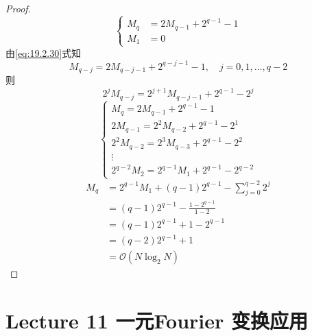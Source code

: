 \documentclass[linespread=1.5,openany]{book}%
\theoremstyle{plain}
\begin{document}
{{{\begin{proof}
						\begin{equation}\label{eq:19.2.30}
							\left\{
							\begin{aligned}
								M_q &= 2 M_{q-1} + 2^{q-1} -1 \\[8pt]
								M_1 &= 0
							\end{aligned}
							\right.
						\end{equation}
						由\eqref{eq:19.2.30}式知 
						\begin{equation}
							M_{q-j} = 2 M_{q-j-1} + 2^{q -j -1} -1, \quad j=0,1,\ldots,q-2
						\end{equation}
						则
						\begin{equation} 
							2^j M_{q-j} = 2^{j+1} M_{q-j-1} + 2^{q-1} - 2^j
						\end{equation}
						\[
						\begin{cases}
							M_{q} = 2M_{q - 1} + 2^{q - 1} - 1 \\
							2M_{q - 1} = 2^{2}M_{q - 2} + 2^{q - 1} - 2^{1} \\
							2^{2}M_{q - 2} = 2^{3}M_{q - 3} + 2^{q - 1} - 2^{2} \\
							\vdots \\
							2^{q - 2}M_{2} = 2^{q - 1}M_{1} + 2^{q - 1} - 2^{q - 2}
						\end{cases}
						\]
						\[
						\begin{aligned}
							M_{q}&=2^{q - 1}M_{1}+(q - 1)2^{q - 1}-\sum_{j = 0}^{q - 2}2^{j}\\
							&=(q - 1)2^{q - 1}-\frac{1 - 2^{q - 1}}{1 - 2}\\
							&=(q - 1)2^{q - 1}+1 - 2^{q - 1}\\
							&=(q - 2)2^{q - 1}+1\\
							&=\mathcal{O}(N\log_{2}N)
						\end{aligned}
						\]
						
					\end{proof}
				}
			}
			\part{Lecture 11 一元Fourier 变换应用}
			{
}}
\end{document}
